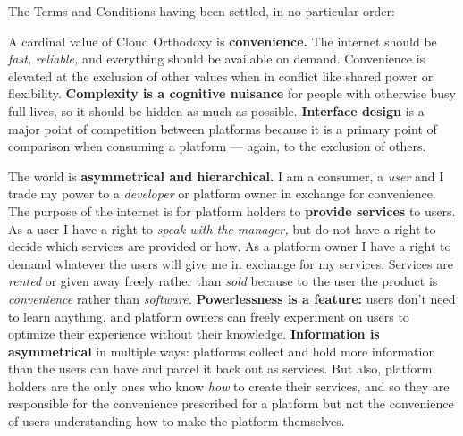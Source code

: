 The Terms and Conditions having been settled, in no particular order:

A cardinal value of Cloud Orthodoxy is \textbf{convenience.} The
internet should be \emph{fast,} \emph{reliable,} and
everything
should be available on demand. Convenience is elevated at the exclusion
of other values when in conflict like shared power or flexibility.
\textbf{Complexity is a cognitive nuisance} for people with otherwise
busy full lives, so it should be hidden as much as possible.
\textbf{Interface design} is a major point of competition between
platforms because it is a primary point of comparison when consuming a
platform --- again, to the exclusion of others.

The world is \textbf{asymmetrical and hierarchical.} I am a consumer, a
\emph{user} and I trade my power to a \emph{developer} or platform owner
in exchange for convenience. The purpose of the internet is for platform
holders to \textbf{provide services} to users. As a user I have a right
to \emph{speak with the manager,} but do not have a right to decide
which services are provided or how. As a platform owner I have a right
to demand whatever the users will give me in exchange for my services.
Services are \emph{rented} or given away freely
rather than \emph{sold} because to the user the product is
\emph{convenience} rather than \emph{software.} \textbf{Powerlessness is
a feature:} users don't need to learn anything, and platform owners can
freely experiment on users to optimize their experience without their
knowledge. \textbf{Information is asymmetrical} in multiple ways:
platforms collect and hold more information than the users can have and
parcel it back out as services. But also, platform holders are the only
ones who know \emph{how} to create their services, and so they are
responsible for the convenience prescribed for a platform but not the
convenience of users understanding how to make the platform themselves.

